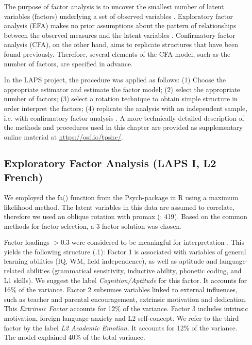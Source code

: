 \documentclass[output=paper]{langsci/langscibook}
\begin{document}
The purpose of factor analysis is to uncover the smallest number of latent variables (factors) underlying a set of observed variables \citep{Brown2006}. Exploratory factor analysis (EFA) makes no prior assumptions about the pattern of relationships between the observed measures and the latent variables \citep{Brown2006}. Confirmatory factor analysis (CFA), on the other hand, aims to replicate structures that have been found previously. Therefore, several elements of the CFA model, such as the number of factors, are specified in advance.

In the LAPS project, the procedure was applied as follows: (1) Choose the appropriate estimator and estimate the factor model; (2) select the appropriate number of factors; (3) select a rotation technique to obtain simple structure in order interpret the factors; (4) replicate the analysis with an independent sample, i.e. with confirmatory factor analysis \citep{Brown2006}. A more technically detailed description of the methods and procedures used in this chapter are provided as supplementary online material at \url{https://osf.io/tpshc/}.

\subsection{Exploratory Factor Analysis (LAPS I, L2 French)}

We employed the fa() function from the Psych-package in R \citep{Revelle2018} using a maximum likelihood method. The latent variables in this data are assumed to correlate, therefore we used an oblique rotation with promax (\citealt{BortzSchuster2010}: 419). Based on the common methods for factor selection, a 3-factor solution was chosen. 



Factor loadings $> 0.3$ were considered to be meaningful for interpretation \citep[30]{Brown2006}. This yields the following structure (.1): Factor 1 is associated with variables of general learning abilities (IQ, WM, field independence), as well as aptitude and language-related abilities (grammatical sensitivity, inductive ability, phonetic coding, and L1 skills). We suggest the label \textit{Cognition/Aptitude} for this factor. It accounts for 16\% of the variance. Factor 2 subsumes variables linked to external influences, such as teacher and parental encouragement, extrinsic motivation and dedication. This \textit{Extrinsic Factor} accounts for 12\% of the variance. Factor 3 includes intrinsic motivation, foreign language anxiety and L2 self-concept. We refer to the third factor by the label \textit{L2 Academic Emotion}. It accounts for 12\% of the variance. The model explained 40\% of the total variance. 
\end{document}
